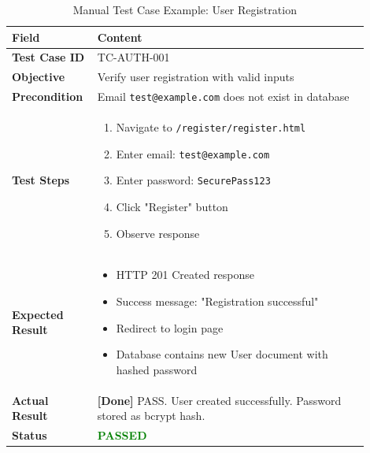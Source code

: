 \documentclass[12pt, a4paper]{report}
\begin{document}
\begin{table}[H]
\centering
\caption{Manual Test Case Example: User Registration}
\label{tab:test_register}
\small
\begin{tabular}{@{}p{0.18\linewidth}p{0.72\linewidth}@{}}
\toprule
\textbf{Field} & \textbf{Content} \\
\midrule
\textbf{Test Case ID} & TC-AUTH-001 \\
\textbf{Objective} & Verify user registration with valid inputs \\
\textbf{Precondition} & Email \texttt{test@example.com} does not exist in database \\
\textbf{Test Steps} & 
\begin{minipage}[t]{\linewidth}
\begin{enumerate}[nosep,leftmargin=*]
    \item Navigate to \texttt{/register/register.html}
    \item Enter email: \texttt{test@example.com}
    \item Enter password: \texttt{SecurePass123}
    \item Click "Register" button
    \item Observe response
\end{enumerate}
\end{minipage} \\
\textbf{Expected Result} & 
\begin{minipage}[t]{\linewidth}
\begin{itemize}[nosep,leftmargin=*]
    \item HTTP 201 Created response
    \item Success message: "Registration successful"
    \item Redirect to login page
    \item Database contains new User document with hashed password
\end{itemize}
\end{minipage} \\
\textbf{Actual Result} & \textbf{[Done]} PASS. User created successfully. Password stored as bcrypt hash. \\
\textbf{Status} & \textcolor{green}{\textbf{PASSED}} \\
\bottomrule
\end{tabular}
\end{table}
\end{document}
